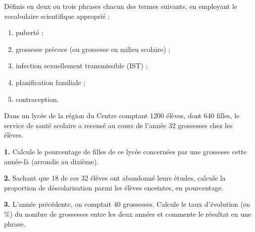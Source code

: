\documentclass[11pt]{article}
\newcounter{popsec}
\newcounter{popsub}
\newcommand{\courssub}[1]{%
  \stepcounter{popsub}%
  \par\vspace{9pt}\noindent{\popxbold\fontsize{11.5}{13}\selectfont\color{popink}{\color{poporange}\thepopsec.\thepopsub}\hspace{6pt}#1}\par\nopagebreak\vspace{4pt}
}
\begin{document}
\begin{exercice}[Définitions]
Définis en deux ou trois phrases chacun des termes suivants, en employant le vocabulaire scientifique approprié :
\begin{enumerate}
\item puberté ;
\item grossesse précoce (ou grossesse en milieu scolaire) ;
\item infection sexuellement transmissible (IST) ;
\item planification familiale ;
\item contraception.
\end{enumerate}
\end{exercice}

\begin{exercice}
Dans un lycée de la région du Centre comptant \num{1200} élèves, dont \num{640} filles, le service de santé scolaire a recensé au cours de l'année 32 grossesses chez les élèves.

\textbf{1.} Calcule le pourcentage de filles de ce lycée concernées par une grossesse cette année-là (arrondis au dixième).

\textbf{2.} Sachant que 18 de ces 32 élèves ont abandonné leurs études, calcule la proportion de déscolarisation parmi les élèves enceintes, en pourcentage.

\textbf{3.} L'année précédente, on comptait 40 grossesses. Calcule le taux d'évolution (en \%) du nombre de grossesses entre les deux années et commente le résultat en une phrase.
\end{exercice}

\courssub{Je m'entraîne}
\end{document}
